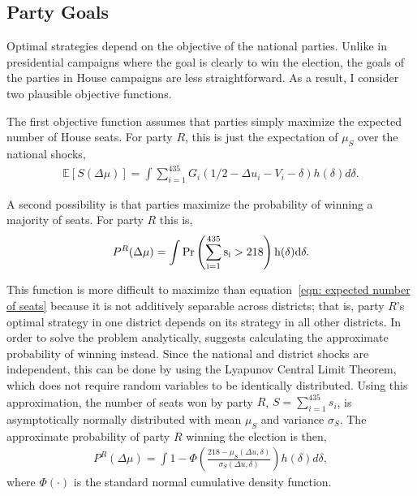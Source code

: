 \documentclass[12pt,final,fleqn]{article}
\theoremstyle{plain}
\newcommand\E{\mathbb{E}}
\begin{document}
\subsection{Party Goals}
Optimal strategies depend on the objective of the national parties. Unlike in presidential campaigns where the goal is clearly to win the election, the goals of the parties in House campaigns are less straightforward. As a result, I consider two plausible objective functions. 

The first objective function assumes that parties simply maximize the expected number of House seats. For party $R$, this is just the expectation of $\mu_S$ over the national shocks,
\begin{align} \label{eqn: expected number of seats}
\E\left[S (\Delta \mu)\right] = \int \sum_{i=1}^{435} G_i(1/2 - \Delta u_i - V_i - \delta)h(\delta) d\delta.
\end{align}

A second possibility is that parties maximize the probability of winning a majority of seats. For party $R$ this is,
\begin{align}
P^R(\Delta \mu) = \int \rm{Pr}\left(\sum_{i=1}^{435} s_i > 218 \right) h(\delta)d \delta.
\end{align}

This function is more difficult to maximize than equation~\ref{eqn: expected number of seats} because it is not additively separable across districts; that is, party $R$'s optimal strategy in one district depends on its strategy in all other districts. In order to solve the problem analytically, \citet{stromberg2008electoral} suggests calculating the approximate probability of winning instead. Since the national and district shocks are independent, this can be done by using the Lyapunov Central Limit Theorem, which does not require random variables to be identically distributed. Using this approximation, the number of seats won by party $R$, $S=\sum_{i=1}^{435} s_i$, is asymptotically normally distributed with mean $\mu_S$ and variance $\sigma_S$. The approximate probability of party $R$ winning the election is then,
\begin{align}
P^R(\Delta \mu) = \int 1 - \Phi\left(\frac{218 - \mu_S(\Delta u, \delta)}{\sigma_S(\Delta u, \delta)}\right) h(\delta)d\delta,
\end{align}
where $\Phi(\cdot)$ is the standard normal cumulative density function.
\end{document}
